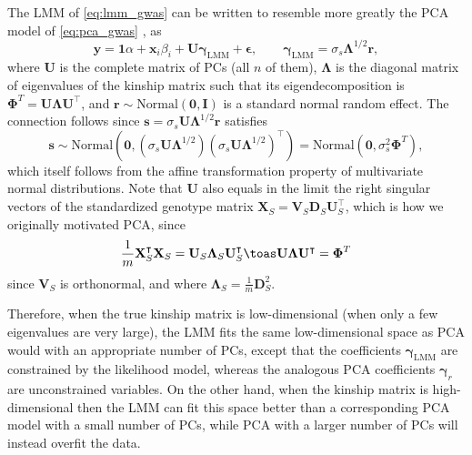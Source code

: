 \documentclass[11pt]{article}
\begin{document}
The LMM of \cref{eq:lmm_gwas} can be written to resemble more greatly the PCA model of \cref{eq:pca_gwas} \citep{astle_population_2009, hoffman_correcting_2013}, as
\begin{equation}
  \label{eq:lmm_gwas_evd}
  \mathbf{y}
  =
  \mathbf{1} \alpha + \mathbf{x}_i \beta_i + \mathbf{U} \boldsymbol{\gamma}_\text{LMM} + \boldsymbol{\epsilon}
  , \quad\quad
  \boldsymbol{\gamma}_\text{LMM} = \sigma_s \boldsymbol{\Lambda}^{1/2} \mathbf{r}
  ,
\end{equation}
where $\mathbf{U}$ is the complete matrix of PCs (all $n$ of them), $\boldsymbol{\Lambda}$ is the diagonal matrix of eigenvalues of the kinship matrix such that its eigendecomposition is $\mathbf{\Phi}^T = \mathbf{U} \boldsymbol{\Lambda} \mathbf{U}^\intercal$, and $\mathbf{r} \sim \text{Normal}(\mathbf{0},\mathbf{I})$ is a standard normal random effect.
The connection follows since $\mathbf{s} = \sigma_s \mathbf{U} \boldsymbol{\Lambda}^{1/2} \mathbf{r}$ satisfies
$$
\mathbf{s} \sim \text{Normal} \left( \mathbf{0}, \left( \sigma_s \mathbf{U} \boldsymbol{\Lambda}^{1/2} \right) \left( \sigma_s \mathbf{U} \boldsymbol{\Lambda}^{1/2} \right)^\intercal \right)
= \text{Normal}( \mathbf{0}, \sigma_s^2 \mathbf{\Phi}^T ),
$$
which itself follows from the affine transformation property of multivariate normal distributions.
Note that $\mathbf{U}$ also equals in the limit the right singular vectors of the standardized genotype matrix $\mathbf{X}_S = \mathbf{V}_S \mathbf{D}_S \mathbf{U}_S^\intercal$, which is how we originally motivated PCA, since
$$
\frac{1}{m} \mathbf{X}_S^\intercal \mathbf{X}_S
= \mathbf{U}_S \mathbf{\Lambda}_S \mathbf{U}_S^\intercal
\toas
\mathbf{U} \mathbf{\Lambda} \mathbf{U}^\intercal
=
\mathbf{\Phi}^T
$$
since $\mathbf{V}_S$ is orthonormal, and where $\mathbf{\Lambda}_S = \frac{1}{m} \mathbf{D}_S^2$.

Therefore, when the true kinship matrix is low-dimensional (when only a few eigenvalues are very large), the LMM fits the same low-dimensional space as PCA would with an appropriate number of PCs, except that the coefficients $\boldsymbol{\gamma}_\text{LMM}$ are constrained by the likelihood model, whereas the analogous PCA coefficients $\boldsymbol{\gamma}_r$ are unconstrained variables.
On the other hand, when the kinship matrix is high-dimensional then the LMM can fit this space better than a corresponding PCA model with a small number of PCs, while PCA with a larger number of PCs will instead overfit the data.
\end{document}
